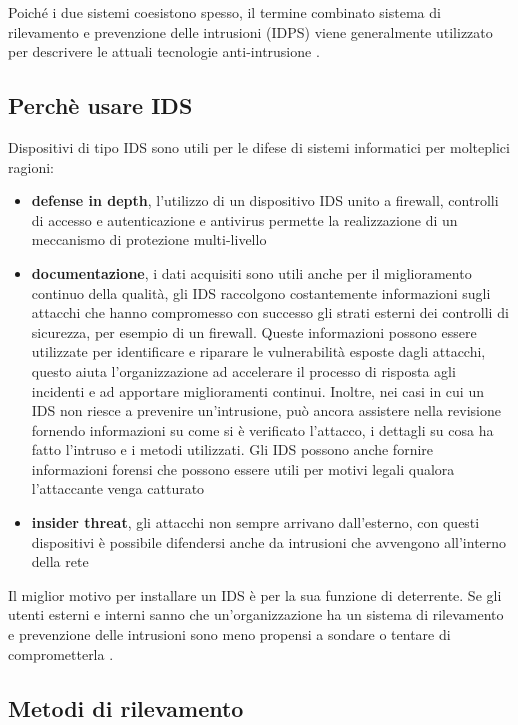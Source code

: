 \documentclass[../main.tex]{subfiles}
\begin{document}
Poiché i due sistemi coesistono spesso, il termine combinato sistema di rilevamento e prevenzione delle intrusioni (IDPS) viene generalmente utilizzato per descrivere le attuali tecnologie anti-intrusione \cite{IPS}.


\subsection{Perchè usare IDS}
Dispositivi di tipo IDS sono utili per le difese di sistemi informatici per molteplici ragioni:
\begin{itemize}
				\item \textbf{defense in depth}, l'utilizzo di un dispositivo IDS unito a firewall, controlli di accesso e autenticazione e antivirus permette la realizzazione di un meccanismo di protezione multi-livello
				\item \textbf{documentazione}, i dati acquisiti sono utili anche per il miglioramento continuo della qualità, gli IDS raccolgono costantemente informazioni sugli attacchi che hanno compromesso con successo gli strati esterni dei controlli di sicurezza, per esempio di un firewall. Queste informazioni possono essere utilizzate per identificare e riparare le vulnerabilità esposte dagli attacchi, questo aiuta l'organizzazione ad accelerare il processo di risposta agli incidenti e ad apportare miglioramenti continui.
Inoltre, nei casi in cui un IDS non riesce a prevenire un'intrusione, può ancora assistere nella revisione fornendo informazioni su come si è verificato l'attacco, i dettagli su cosa ha fatto l'intruso e i metodi utilizzati. Gli IDS possono anche fornire informazioni forensi che possono essere utili per motivi legali qualora l'attaccante venga catturato \cite{IPS}
				\item \textbf{insider threat}, gli attacchi non sempre arrivano dall'esterno, con questi dispositivi è possibile difendersi anche da intrusioni che avvengono all'interno della rete
\end{itemize}

Il miglior motivo per installare un IDS è per la sua funzione di deterrente. Se gli utenti esterni e interni sanno che un'organizzazione ha un sistema di rilevamento e prevenzione delle intrusioni sono meno propensi a sondare o tentare di comprometterla \cite{IPS}.

\subsection{Metodi di rilevamento}
\end{document}
